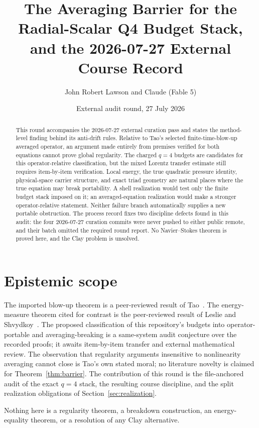 \documentclass[11pt]{article}
\title{The Averaging Barrier for the Radial-Scalar Q4 Budget Stack,\\
and the 2026-07-27 External Course Record}
\author{John Robert Lawson and Claude (Fable 5)}
\date{External audit round, 27 July 2026}
\theoremstyle{remark}
\begin{document}
\maketitle

\begin{abstract}
This round accompanies the 2026-07-27 external curation pass and states
the method-level finding behind its anti-drift rules.  Relative to
Tao's selected finite-time-blow-up averaged operator, an argument made
entirely from premises verified for both equations cannot prove global
regularity.  The charged \(q=4\) budgets are candidates for this
operator-relative classification, but the mixed Lorentz transfer
estimate still requires item-by-item verification.  Local energy, the
true quadratic pressure identity, physical-space carrier structure,
and exact triad geometry are natural places where the true equation may
break portability.  A shell realization would test only the finite
budget stack imposed on it; an averaged-equation realization would make
a stronger operator-relative statement.  Neither failure branch
automatically supplies a new portable obstruction.  The process record fixes two
discipline defects found in this audit: the four 2026-07-27 curation
commits were never pushed to either public remote, and their batch
omitted the required round report.  No Navier--Stokes theorem is proved
here, and the Clay problem is unsolved.
\end{abstract}

\section{Epistemic scope}

The imported blow-up theorem is a peer-reviewed result of
Tao~\cite{Tao16}.  The energy-measure theorem cited for contrast is the
peer-reviewed result of Leslie and Shvydkoy~\cite{LS18}.  The proposed
classification of this repository's budgets into operator-portable and
averaging-breaking is a same-system audit conjecture over the recorded
proofs; it awaits item-by-item transfer and external mathematical
review.  The observation that
regularity arguments insensitive to nonlinearity averaging cannot close
is Tao's own stated moral; no literature novelty is claimed for
Theorem~\ref{thm:barrier}.  The contribution of this round is the
file-anchored audit of the exact \(q=4\) stack, the resulting course
discipline, and the split realization obligations of
Section~\ref{sec:realization}.

Nothing here is a regularity theorem, a breakdown construction, an
energy-equality theorem, or a resolution of any Clay alternative.
\end{document}
